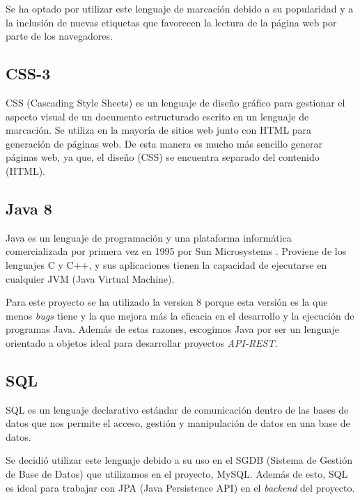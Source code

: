     Se ha optado por utilizar este lenguaje de marcación debido a su popularidad y a la inclusión de nuevas etiquetas que favorecen la lectura de la página web por parte de los navegadores.
    \newline
    
    \subsection{CSS-3}
    CSS\cite{css} (Cascading Style Sheets) es un lenguaje de diseño gráfico para gestionar el aspecto visual de un documento estructurado escrito en un lenguaje de marcación. Se utiliza en la mayoría de sitios web junto con HTML para generación de páginas web. De esta manera es mucho más sencillo generar páginas web, ya que, el diseño (CSS) se encuentra separado del contenido (HTML). \newline

    \subsection{Java 8}
    Java\cite{java} es un lenguaje de programación y una plataforma informática comercializada por primera vez en 1995 por Sun Microsystems\cite{sun} . Proviene de los lenguajes C y C++, y sus aplicaciones tienen la capacidad de ejecutarse en cualquier JVM (Java Virtual Machine).
    \newline
    
    Para este proyecto se ha utilizado la version 8 porque esta versión es la que menos \textit{bugs} tiene y la que mejora más la eficacia en el desarrollo y la ejecución de programas Java\cite{java8}. Además de estas razones, escogimos Java por ser un lenguaje orientado a objetos ideal para desarrollar proyectos \textit{API-REST}.
    
    \subsection{SQL}
    SQL\cite{sql} es un lenguaje declarativo estándar de comunicación dentro de las bases de datos que nos permite el acceso, gestión y manipulación de datos en una base de datos.
    \newline
    
    Se decidió utilizar este lenguaje debido a su uso en el SGDB (Sistema de Gestión de Base de Datos) que utilizamos en el proyecto, MySQL. Además de esto, SQL es ideal para trabajar con JPA (Java Persistence API) en el \textit{backend} del proyecto.
    
